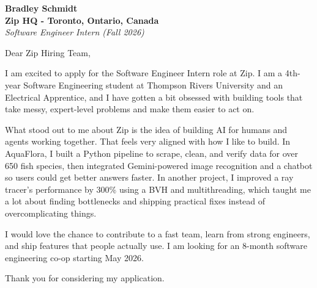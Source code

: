 \documentclass[11pt]{article}
\begin{document}
\textbf{Bradley Schmidt}\\
\vspace{0.5em}
\textbf{Zip HQ - Toronto, Ontario, Canada}\\
\textit{Software Engineer Intern (Fall 2026)}

Dear Zip Hiring Team,

\par

I am excited to apply for the Software Engineer Intern role at Zip. I am a 4th-year Software Engineering student at Thompson Rivers University and an Electrical Apprentice, and I have gotten a bit obsessed with building tools that take messy, expert-level problems and make them easier to act on.

\par

What stood out to me about Zip is the idea of building AI for humans and agents working together. That feels very aligned with how I like to build. In AquaFlora, I built a Python pipeline to scrape, clean, and verify data for over 650 fish species, then integrated Gemini-powered image recognition and a chatbot so users could get better answers faster. In another project, I improved a ray tracer's performance by 300\% using a BVH and multithreading, which taught me a lot about finding bottlenecks and shipping practical fixes instead of overcomplicating things.

\par

I would love the chance to contribute to a fast team, learn from strong engineers, and ship features that people actually use. I am looking for an 8-month software engineering co-op starting May 2026.

\par

Thank you for considering my application.
\end{document}
